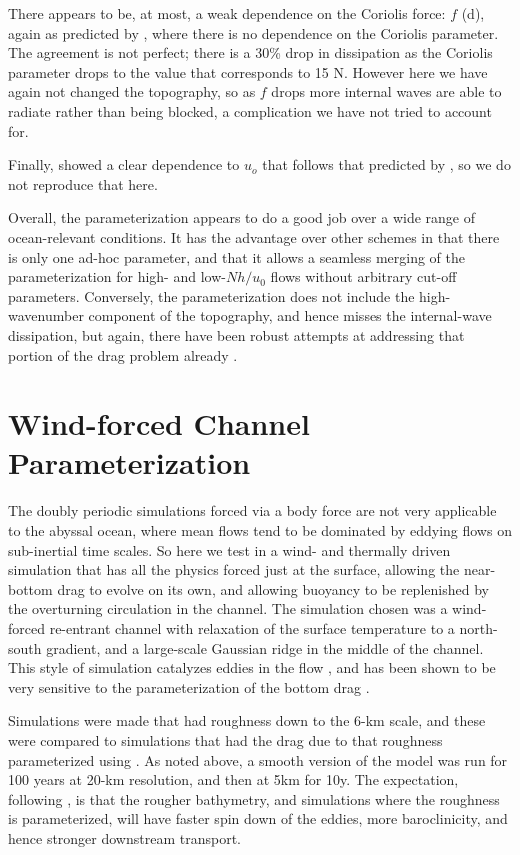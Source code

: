 \documentclass[twocol]{ametsocV5}
\begin{document}
There appears to be, at most, a weak dependence on the Coriolis force: $f$ (d), again as predicted by , where there is no dependence on the Coriolis parameter.  The agreement is not perfect; there is a 30\% drop in dissipation as the Coriolis parameter drops to the value that corresponds to 15 N.  However here we have again not changed the topography, so as $f$ drops more internal waves are able to radiate rather than being blocked, a complication we have not tried to account for.  

Finally, \citet{klymak18} showed a clear dependence to $u_o$  that follows that predicted by , so we do not reproduce that here.

Overall, the parameterization appears to do a good job over a wide range of ocean-relevant conditions.  It has the advantage over other schemes in that there is only one ad-hoc parameter, and that it allows a seamless merging of the parameterization for high- and low-$Nh/u_0$ flows without arbitrary cut-off parameters.  Conversely, the parameterization does not include the high-wavenumber component of the topography, and hence misses the internal-wave dissipation, but again, there have been robust attempts at addressing  that portion of the drag problem already \citep{nikurashinferrari14}. 

\section{Wind-forced Channel Parameterization}
\label{sec:ResultsWindForcing}

The doubly periodic simulations forced via a body force are not very applicable to the abyssal ocean, where mean flows tend to be dominated by eddying flows on sub-inertial time scales.  So here we test in a wind- and thermally driven simulation that has all the physics forced just at the surface, allowing the near-bottom drag to evolve on its own, and allowing buoyancy to be replenished by the overturning circulation in the channel.  The simulation chosen was a wind-forced re-entrant channel with relaxation of the surface temperature to a north-south gradient, and a large-scale Gaussian ridge in the middle of the channel.  This style of simulation catalyzes eddies in the flow \citep{abernatheycessi14}, and has been shown to be very sensitive to the parameterization of the bottom drag \citep{Marshall_2017}.  

Simulations were made that had roughness down to the 6-km scale, and these were compared to simulations that had the drag due to that roughness parameterized using .  As noted above, a smooth version of the model was run for 100 years at 20-km resolution, and then at 5km for 10y.   The expectation, following \citet{Marshall_2017}, is that the rougher bathymetry, and simulations where the roughness is parameterized, will have faster spin down of the eddies, more baroclinicity, and hence stronger downstream transport.  
\end{document}
